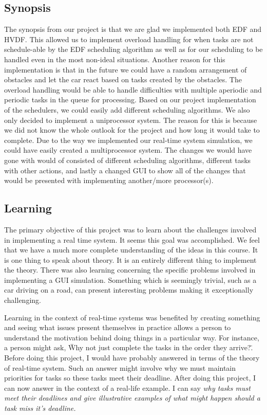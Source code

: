 \documentclass{article} %
\begin{document}
\subsection{Synopsis}
The synopsis from our project is that we are glad we implemented both EDF and 
HVDF.  This allowed us to implement overload handling for when tasks are not 
schedule-able by the EDF scheduling algorithm as well as for our scheduling to be 
handled even in the most non-ideal situations.  Another reason for this 
implementation is that in the future we could have a random arrangement of 
obstacles and let the car react based on tasks created by the obstacles.  The overload 
handling would be able to handle difficulties with multiple aperiodic and periodic 
tasks in the queue for processing.   Based on our project implementation of the 
schedulers, we could easily add different scheduling algorithms. 
We also only decided to implement a uniprocessor system.  The reason for this is 
because we did not know the whole outlook for the project and how long it would 
take to complete.  Due to the way we implemented our real-time system simulation, 
we could have easily created a multiprocessor system.  The changes we would have 
gone with would of consisted of different scheduling algorithms, different tasks with 
other actions, and lastly a changed GUI to show all of the changes that would be 
presented with implementing another/more processor(s).

\subsection{Learning}
The primary objective of this project was to learn about the challenges involved in implementing a real time system.
It seems this goal was accomplished. We feel that we have a much more complete understanding of the ideas in this course.
It is one thing to speak about theory. It is an entirely different thing to implement the theory.
There was also learning concerning the specific problems involved in implementing a GUI simulation.
Something which is seemingly trivial, such as a car driving on a road, can present interesting problems making it exceptionally challenging.

Learning in the context of real-time systems was benefited by
creating something and seeing what issues present themselves in practice allows a person to understand the motivation behind doing things in a particular way.
For instance, a person might ask, \"Why not just complete the tasks in the order they arrive?\". Before doing this project, I would have probably answered in terms of the theory of real-time system.
Such an answer might involve why we must maintain priorities for tasks so these tasks meet their deadline.
After doing this project, I can now answer in the context of a real-life example. I can say
\it why \normalfont
tasks must meet their deadlines and give illustrative examples of what might happen should a task miss it's deadline.
\end{document}
